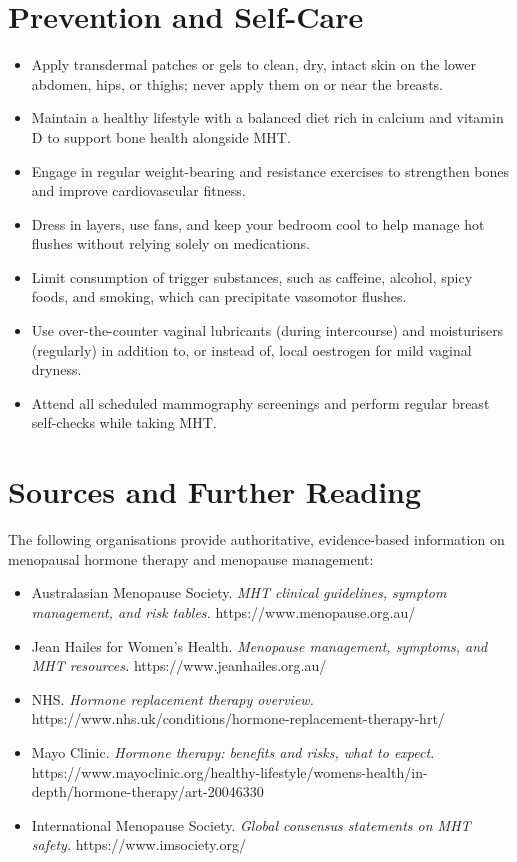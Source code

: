 \section*{Prevention and Self-Care}
\begin{itemize}
    \item Apply transdermal patches or gels to clean, dry, intact skin on the lower abdomen, hips, or thighs; never apply them on or near the breasts.
    \item Maintain a healthy lifestyle with a balanced diet rich in calcium and vitamin D to support bone health alongside MHT.
    \item Engage in regular weight-bearing and resistance exercises to strengthen bones and improve cardiovascular fitness.
    \item Dress in layers, use fans, and keep your bedroom cool to help manage hot flushes without relying solely on medications.
    \item Limit consumption of trigger substances, such as caffeine, alcohol, spicy foods, and smoking, which can precipitate vasomotor flushes.
    \item Use over-the-counter vaginal lubricants (during intercourse) and moisturisers (regularly) in addition to, or instead of, local oestrogen for mild vaginal dryness.
    \item Attend all scheduled mammography screenings and perform regular breast self-checks while taking MHT.
\end{itemize}

\section*{Sources and Further Reading}
The following organisations provide authoritative, evidence-based information on menopausal hormone therapy and menopause management:
\begin{itemize}
    \item Australasian Menopause Society. \textit{MHT clinical guidelines, symptom management, and risk tables.} https://www.menopause.org.au/
    \item Jean Hailes for Women's Health. \textit{Menopause management, symptoms, and MHT resources.} https://www.jeanhailes.org.au/
    \item NHS. \textit{Hormone replacement therapy overview.} https://www.nhs.uk/conditions/hormone-replacement-therapy-hrt/
    \item Mayo Clinic. \textit{Hormone therapy: benefits and risks, what to expect.} https://www.mayoclinic.org/healthy-lifestyle/womens-health/in-depth/hormone-therapy/art-20046330
    \item International Menopause Society. \textit{Global consensus statements on MHT safety.} https://www.imsociety.org/
\end{itemize}
